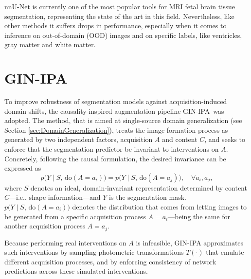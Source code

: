 nnU-Net is currently one of the most popular tools for MRI fetal brain tissue segmentation, representing the state of the art in this field. Nevertheless, like other methods it suffers drops in performance, especially when it comes to inference on out-of-domain (OOD) images and on specific labels, like ventricles, gray matter and white matter.

\section{GIN-IPA} \label{sec:gin-ipa}
To improve robustness of segmentation models against acquisition-induced domain shifts, the causality-inspired augmentation pipeline GIN-IPA\,\cite{Ouyang2023} was adopted. The method, that is aimed at single-source domain generalization (see Section \ref{sec:DomainGeneralization}), treats the image formation process as generated by two independent factors, acquisition $A$ and content $C$, and seeks to enforce that the segmentation predictor be invariant to interventions on $A$. Concretely, following the causal formulation, the desired invariance can be expressed as
\begin{equation}\label{eq:domain-inv}
    p\bigl(Y\mid S,\,\mathrm{do}(A= a_i)\bigr) 
    = p\bigl(Y\mid S,\,\mathrm{do}(A= a_j)\bigr), \quad \forall a_i,a_j,
\end{equation}
where $S$ denotes an ideal, domain-invariant representation determined by content $C$---i.e., shape information---and $Y$ is the segmentation mask. $p\bigl(Y\mid S,\,\mathrm{do}(A= a_i)\bigr)$ denotes the distribution that comes from letting images to be generated from a specific acquisition process $A = a_i$---being the same for another acquisition process $A = a_j$.

Because performing real interventions on $A$ is infeasible, GIN-IPA approximates such interventions by sampling photometric transformations $T(\cdot)$ that emulate different acquisition processes, and by enforcing consistency of network predictions across these simulated interventions.

